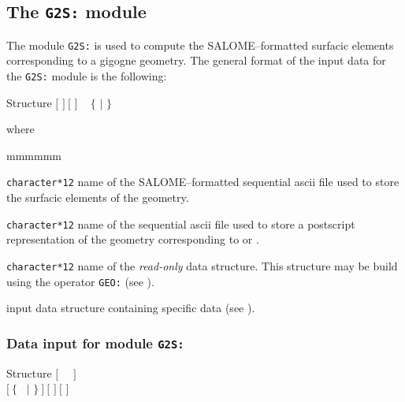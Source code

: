 \subsection{The {\tt G2S:} module}\label{sect:G2SData}

The module {\tt G2S:} is used to compute the SALOME--formatted surfacic elements corresponding
to a gigogne geometry. The general format of the input data for the {\tt G2S:} module is the following:
\begin{DataStructure}{Structure }
$[$  $]~[$  $]$ \moc{:=} ~ $\{$  $|$  $\}$ ~\moc{::}~ \\
\end{DataStructure}

\noindent where
\begin{ListeDeDescription}{mmmmmm}

\item[\dusa{SURFIL}] \texttt{character*12} name of the SALOME--formatted sequential {\sc ascii}
file used to store the surfacic elements of the geometry.

\item[\dusa{PSFIL}] \texttt{character*12} name of the sequential {\sc ascii}
file used to store a postscript representation of the geometry corresponding to  or .

\item[\dusa{GEONAM}] {\tt character*12} name of the {\sl read-only}  data
structure. This structure may be build using the operator {\tt GEO:} (see ).

\item[\dusa{G2S\_data}] input data structure containing specific data (see ).
\end{ListeDeDescription}

\subsubsection{Data input for module {\tt G2S:}}\label{sect:descG2S}

\vskip -0.5cm

\begin{DataStructure}{Structure }
$[$~ ~$]$ \\
$[~\{$~ $|$  $\}~]~[$    $]~[$    $]$ \\
\moc{;}
\end{DataStructure}

